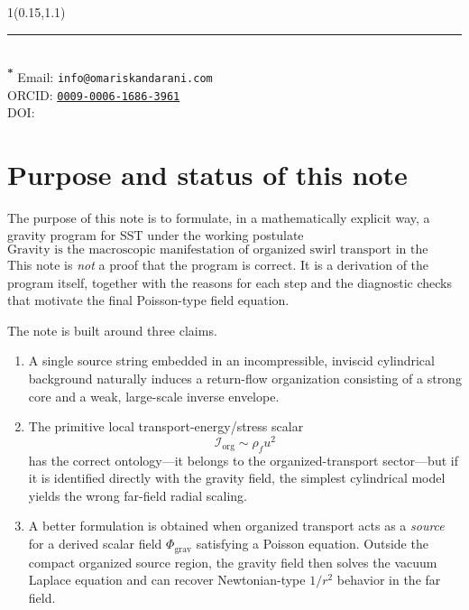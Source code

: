 \documentclass[11pt]{article}
\newcommand{\rhoF}{\rho_{\!f}}
\newcommand{\grav}{\mathrm{grav}}
\newcommand{\org}{\mathrm{org}}
\begin{document}
    \begin{textblock*}{1\textwidth}(0.15\textwidth,1.1\textheight)\raggedright\footnotesize\renewcommand{\arraystretch}{1.0} \noindent\rule{\textwidth}{0.4pt}\\[0.5em]
        \textsuperscript{\textbf{*}} Email: \texttt{info@omariskandarani.com}\\  
        ORCID: \texttt{\href{https://orcid.org/0009-0006-1686-3961}{0009-0006-1686-3961}}\\
        DOI: \href{https://doi.org/\paperdoi}{\paperdoi}    
    \end{textblock*}
        

        \newpage
        \tableofcontents
        \newpage
    
        \section{Purpose and status of this note}
            
            The purpose of this note is to formulate, in a mathematically explicit way, a gravity program for SST under the working postulate
            \begin{equation}
                \boxed{
                    \text{Gravity is the macroscopic manifestation of organized swirl transport in the medium.}
                }
                \label{eq:gravity-postulate}
            \end{equation}
            This note is \emph{not} a proof that the program is correct. It is a derivation of the program itself, together with the reasons for each step and the diagnostic checks that motivate the final Poisson-type field equation.
            
            The note is built around three claims.
            
            \begin{enumerate}[label=\textbf{Claim \arabic*:},leftmargin=2.2cm]
\item A single source string embedded in an incompressible, inviscid cylindrical background naturally induces a return-flow organization consisting of a strong core and a weak, large-scale inverse envelope.

\item The primitive local transport-energy/stress scalar
\begin{equation}
    \mathcal{I}_{\org} \sim \rhoF u^2
    \label{eq:Iorg-primitive}
\end{equation}
has the correct ontology---it belongs to the organized-transport sector---but if it is identified directly with the gravity field, the simplest cylindrical model yields the wrong far-field radial scaling.

\item A better formulation is obtained when organized transport acts as a \emph{source} for a derived scalar field \(\Phi_{\grav}\) satisfying a Poisson equation. Outside the compact organized source region, the gravity field then solves the vacuum Laplace equation and can recover Newtonian-type \(1/r^2\) behavior in the far field.
            \end{enumerate}
        
\end{document}
